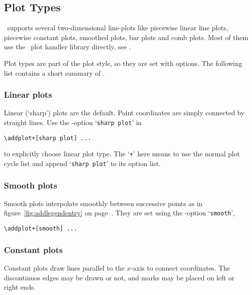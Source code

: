\subsection{Plot Types}
\PGFPlots\ supports several two-dimensional line-plots like piecewise linear line plots, piecewise constant plots, smoothed plots, bar plots and comb plots. Most of them use the \PGF\ plot handler library directly, see \cite[section 18.8]{tikz}.

Plot types are part of the plot style, so they are set with options. The following list contains a short summary of \cite[section 18.8]{tikz}.

\subsubsection{Linear plots}
Linear (`sharp') plots are the default. Point coordinates are simply connected by straight lines. Use the \Tikz-option `\texttt{sharp plot}' in
\begin{lstlisting}
\addplot+[sharp plot] ...
\end{lstlisting}
to explicitly choose linear plot type. The `\texttt{+}' here means to use the normal plot cycle list and append `\texttt{sharp plot}' to its option list.

\subsubsection{Smooth plots}
Smooth plots interpolate smoothly between successive points as in figure~\ref{fig:addlegendentry} on page~\pageref{fig:addlegendentry}. They are set using the \Tikz-option `\texttt{smooth}',
\begin{lstlisting}
\addplot+[smooth] ...
\end{lstlisting}

\subsubsection{Constant plots}
Constant plots draw lines parallel to the $x$-axis to connect coordinates. The discontinuos edges may be drawn or not, and marks may be placed on left or right ends.

